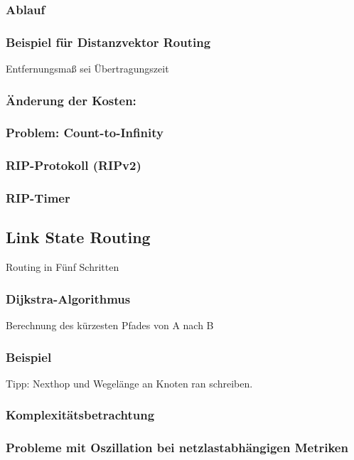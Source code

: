 \subsubsection{Ablauf}
\subsubsection{Beispiel für Distanzvektor Routing}
Entfernungsmaß sei Übertragungszeit
\subsubsection{Änderung der Kosten:}
\subsubsection{Problem: Count-to-Infinity}
\subsubsection{RIP-Protokoll (RIPv2)}
\subsubsection*{RIP-Timer}

\subsection{Link State Routing}
Routing in Fünf Schritten
\subsubsection{Dijkstra-Algorithmus}
Berechnung des kürzesten Pfades von A nach B
\subsubsection*{Beispiel}
Tipp: Nexthop und Wegelänge an Knoten ran schreiben.
\subsubsection*{Komplexitätsbetrachtung}
\subsubsection*{Probleme mit Oszillation bei netzlastabhängigen Metriken}

